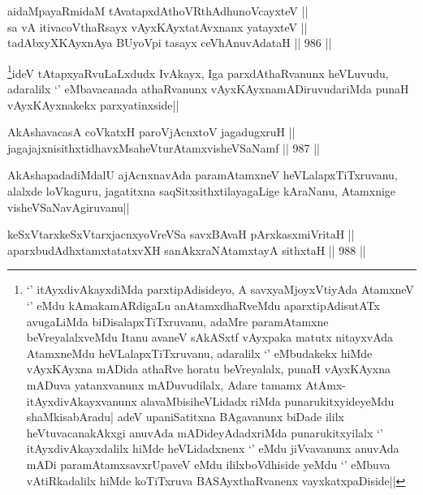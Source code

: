 
\begin{shl}
aidaMpayaRmidaM tAvatapxdAthoVR\s thAdhunoVcayxteV || \\
sa vA itivacoVthaRsayx vAyxKAyxtatAvxnanx yatayxteV || \\
tadAbxyXKAyxnAya BUyoV\s pi tasayx ceVhAnuvAdataH ||  986 ||  
\end{shl}

\begin{artha}
\footnote{`\stext' itAyxdivAkayxdiMda parxtipAdisideyo, A savxyaMjoyxVtiyAda AtamxneV `\stext' eMdu kAmakamARdigaLu anAtamxdhaRveMdu aparxtipAdisutATx avugaLiMda biDisalapxTiTxruvanu, adaMre paramAtamxne beVreyalalxveMdu Itanu avaneV sAkASxtf vAyxpaka matutx nitayxvAda AtamxneMdu heVLalapxTiTxruvanu, adaralilx `\stext' eMbudakekx hiMde vAyxKAyxna mADida athaRve horatu beVreyalalx, punaH vAyxKAyxna mADuva yatanxvanunx mADuvudilalx, Adare tamamx AtAmx- itAyxdivAkayxvanunx alavaMbisiheVLidadx riMda punarukitxyideyeMdu shaMkisabAradu| adeV upaniSatitxna BAgavanunx biDade ililx heVtuvacanakAkxgi anuvAda mADideyAdadxriMda punarukitxyilalx `\stext' itAyxdivAkayxdalilx hiMde heVLidadxnenx `\stext' eMdu jiVvavanunx anuvAda mADi paramAtamxsavxrUpaveV eMdu ililxboVdhiside yeMdu `\stext' eMbuva vAtiRkadalilx hiMde koTiTxruva BASAyxthaRvanenx vayxkatxpaDiside||}ideV tAtapxyaRvuLaLxdudx IvAkayx, Iga parxdAthaRvanunx heVLuvudu, adaralilx `\stext' eMbavacanada athaRvanunx vAyxKAyxnamADiruvudariMda punaH vAyxKAyxnakekx parxyatinxside||
\end{artha}


\begin{shl}
AkAshavacasA coVkatxH paroV\s jAcnxtoV jagadugxruH || \\
jagajajxnisithxtidhavxMsaheVturAtamxvisheVSaNamf ||  987 ||  
\end{shl}

\begin{artha}
AkAshapadadiMdalU ajAcnxnavAda paramAtamxneV heVLalapxTiTxruvanu, alalxde loVkaguru, jagatitxna saqSitxsithxtilayagaLige kAraNanu, Atamxnige visheVSaNavAgiruvanu||
\end{artha}

\begin{shl}
keSxVtarxkeSxVtarxjacnxyoVreVSa savxBAvaH pArxkasxmiVritaH || \\
aparxbudAdhxtamxtatatxvXH sanAkxraNAtamxtayA sithxtaH ||  988 ||  
\end{shl}

